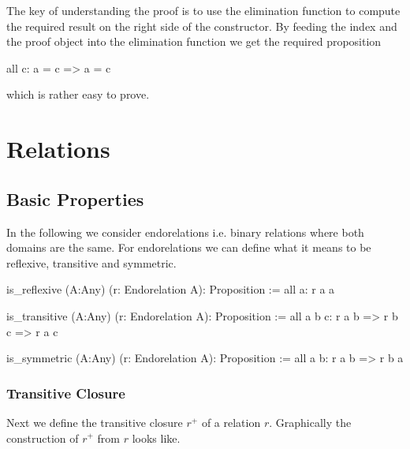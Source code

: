 The key of understanding the proof is to use the elimination function to
compute the required result on the right side of the constructor. By feeding
the index  and the proof object  into the elimination
function we get the required proposition
%
\begin{alba}
  all c: a = c => a = c
\end{alba}
%
which is rather easy to prove.







\newpage
\section{Relations}
\label{sec:certprog-relations}


\subsection{Basic Properties}


In the following we consider endorelations i.e. binary relations where both
domains are the same. For endorelations we can define what it means to be
reflexive, transitive and symmetric.

\begin{alba}
  is_reflexive (A:Any) (r: Endorelation A): Proposition :=
    all a: r a a

  is_transitive (A:Any) (r: Endorelation A): Proposition :=
    all a b c: r a b => r b c => r a c

  is_symmetric (A:Any) (r: Endorelation A): Proposition :=
    all a b: r a b => r b a
\end{alba}



\subsubsection{Transitive Closure}

Next we define the transitive closure $r^+$ of a relation $r$. Graphically the
construction of $r^+$ from $r$ looks like.



